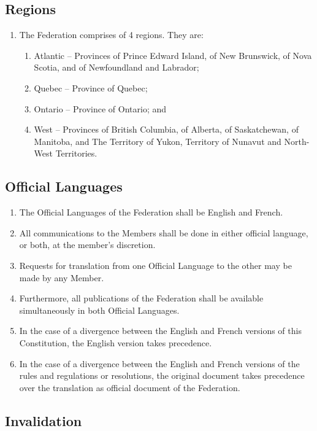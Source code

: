 \subsection{Regions}
\label{regions}

\begin{enumerate}
 \item The Federation comprises of 4 regions. They are:
  \begin{enumerate}
   \item Atlantic – Provinces of Prince Edward Island, of New Brunswick, of Nova Scotia, and of Newfoundland and Labrador;
   \item Quebec – Province of Quebec;
   \item Ontario – Province of Ontario; and
   \item West – Provinces of British Columbia, of Alberta, of Saskatchewan, of Manitoba, and The Territory of Yukon, Territory of Nunavut and North-West Territories.
  \end{enumerate}
\end{enumerate}

\subsection{Official Languages}
\label{official-languages}

\begin{enumerate}
 \item The Official Languages of the Federation shall be English and French.
 \item All communications to the Members shall be done in either official language, or both, at the member's discretion.
 \item Requests for translation from one Official Language to the other may be made by any Member.
 \item Furthermore, all publications of the Federation shall be available simultaneously in both Official Languages.
 \item In the case of a divergence between the English and French versions of this Constitution, the English version takes precedence.
 \item In the case of a divergence between the English and French versions of the rules and regulations or resolutions, the original document takes precedence over the translation as official document of the Federation.
\end{enumerate}

\subsection{Invalidation}
\label{invalidation}

